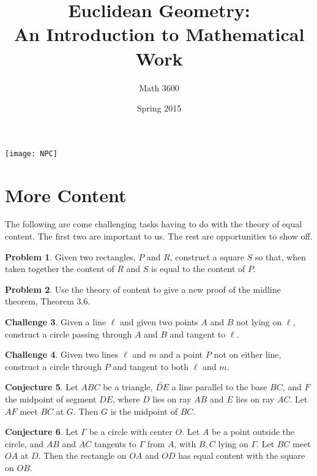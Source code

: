 \documentclass{tufte-handout}
\title{Euclidean Geometry:\\An Introduction to Mathematical Work}
\author[]{Math 3600}
\date{Spring 2015}
\theoremstyle{definition}
\newtheorem{problem}{Problem}[section]
\newtheorem{conjecture}[problem]{Conjecture}
\newtheorem{challenge}[problem]{Challenge}
\begin{document}
\maketitle

\begin{marginfigure}
    \texttt{[image: NPC]}
\end{marginfigure}

\setcounter{section}{14}
\section{More Content}

The following are come challenging tasks having to do with the theory of equal content.
The first two are important to us.
The rest are opportunities to show off.

\begin{problem}\label{prob:subtract-rect}
Given two rectangles, $P$ and $R$, construct a square $S$ so that, when taken together the content of $R$ and $S$ is equal to the content of $P$.
\end{problem}

\begin{problem} \label{conj:parallel-in-triangle} Use the theory of content to give a new proof of the midline theorem, Theorem 3.6.
\end{problem}

\begin{challenge}\label{chal:circle-given-two-points-tangent}
Given a line $\ell$ and given two points $A$ and $B$ not lying on $\ell$, construct a circle passing through $A$ and $B$ and tangent to $\ell$.
\end{challenge}

\begin{challenge}\label{chal:circle-point-two-tangents}
Given two lines $\ell$ and $m$ and a point $P$ not on either line, construct a circle through $P$ and tangent to both $\ell$ and $m$.
\end{challenge}

\begin{conjecture}\label{conj:content-triangle}
Let $ABC$ be a triangle, $\overleftrightarrow{DE}$ a line parallel to the base $BC$, and $F$ the midpoint of segment $DE$, where $D$ lies on ray $AB$ and $E$ lies on ray $AC$. Let $AF$ meet $BC$ at $G$. Then $G$ is the midpoint of $BC$.
\end{conjecture}


\begin{conjecture}\label{conj:content-circle}
Let $\Gamma$ be a circle with center $O$. Let $A$ be a point outside the circle, and $AB$ and $AC$ tangents to $\Gamma$ from $A$, with $B, C$ lying on $\Gamma$. Let $BC$ meet $OA$ at $D$. Then the rectangle on $OA$ and $OD$ has equal content with the square on $OB$.
\end{conjecture}
\end{document}
